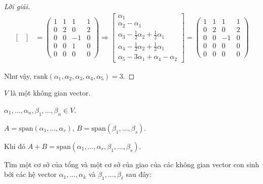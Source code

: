 \documentclass[class=linear-algebra,crop=false]{standalone}
\begin{document}
\begin{proof}[Lời giải]
\begin{align*}
\begin{bmatrix}
        \end{bmatrix} & =
        \begin{pmatrix}
            1 & 1 & 1  & 1 \\
            0 & 2 & 0  & 2 \\
            0 & 0 & -1 & 0 \\
            0 & 0 & 1  & 0 \\
            0 & 0 & 0  & 0
        \end{pmatrix}
        \Longrightarrow
        \begin{bmatrix}
            \alpha_{1}                                                 \\
            \alpha_{2}-\alpha_{1}                                      \\
            \alpha_{3}-\frac{1}{2}\alpha_{2}+\frac{1}{2}\alpha_{1}     \\
            \alpha_{4} - \frac{1}{2}\alpha_{2} + \frac{1}{2}\alpha_{1} \\
            \alpha_{5} - 3\alpha_{1} + \alpha_{4} - \alpha_{2}
        \end{bmatrix}=
        \begin{pmatrix}
            1 & 1 & 1  & 1 \\
            0 & 2 & 0  & 2 \\
            0 & 0 & -1 & 0 \\
            0 & 0 & 0  & 0 \\
            0 & 0 & 0  & 0
        \end{pmatrix}
    \end{align*}
    \par Như vậy, $\text{rank}(\alpha_{1},\alpha_{2},\alpha_{3},\alpha_{4},\alpha_{5}) = 3$.
\end{proof}


\begin{lemma}
    $V$ là một không gian vector.
    \par $\alpha_{1},\ldots,\alpha_{n},\beta_{1},\ldots,\beta_{n}\in V$.
    \par $A = \text{span}(\alpha_{1},\ldots,\alpha_{r})$, $B = \text{span}(\beta_{1},\ldots,\beta_{s})$.
    \par Khi đó $A + B = \text{span}(\alpha_{1},\ldots,\alpha_{r},\beta_{1},\ldots,\beta_{s})$.
\end{lemma}

\par Tìm một cơ sở của tổng và một cơ sở của giao của các không gian vector con sinh bởi các hệ vector $\alpha_{1},\ldots,\alpha_{k}$ và $\beta_{1},\ldots,\beta_{\ell}$ sau đây:
\end{document}
